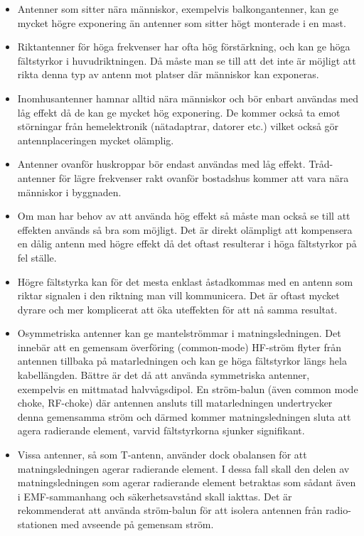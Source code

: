 \begin{itemize}

\item Antenner som sitter nära människor, exempelvis balkongantenner,
kan ge mycket högre exponering än antenner som sitter högt monterade i en mast.

\item Riktantenner för höga frekvenser har ofta hög förstärkning, och
kan ge höga fältstyrkor i huvudriktningen. Då måste man se till att
det inte är möjligt att rikta denna typ av antenn mot platser där
människor kan exponeras.

\item Inomhusantenner hamnar alltid nära människor och bör enbart
användas med låg effekt då de kan ge mycket hög exponering. De kommer
också ta emot störningar från hemelektronik (nätadaptrar, datorer etc.)
vilket också gör antennplaceringen mycket olämplig.

\item Antenner ovanför huskroppar bör endast användas med låg effekt.
Tråd-antenner för lägre frekvenser rakt ovanför bostadshus kommer att
vara nära människor i byggnaden.

\item Om man har behov av att använda hög effekt så måste man också se
till att effekten används så bra som möjligt. Det är direkt olämpligt
att kompensera en dålig antenn med högre effekt då det oftast
resulterar i höga fältstyrkor på fel ställe.

\item Högre fältstyrka kan för det mesta enklast åstadkommas med en
antenn som riktar signalen i den riktning man vill kommunicera. Det är
oftast mycket dyrare och mer komplicerat att öka uteffekten för att nå
samma resultat.

\item Osymmetriska antenner kan ge mantelströmmar i matningsledningen.
Det innebär att en gemensam överföring (common-mode) HF-ström flyter från
antennen tillbaka på matarledningen och kan ge höga fältstyrkor längs hela
kabellängden. Bättre är det då att använda symmetriska antenner, exempelvis en
mittmatad halvvågsdipol. En ström-balun (även common mode choke, RF-choke)
där antennen ansluts till matarledningen undertrycker denna gemensamma
ström och därmed kommer matningsledningen sluta att agera radierande
element, varvid fältstyrkorna sjunker signifikant.

\item Vissa antenner, så som T-antenn, använder dock obalansen för att
matningsledningen agerar radierande element. I dessa fall skall den delen
av matningsledningen som agerar radierande element betraktas som sådant även
i EMF-sammanhang och säkerhetsavstånd skall iakttas. Det är rekommenderat att
använda ström-balun för att isolera antennen från radio-stationen med
avseende på gemensam ström.


\end{itemize}
